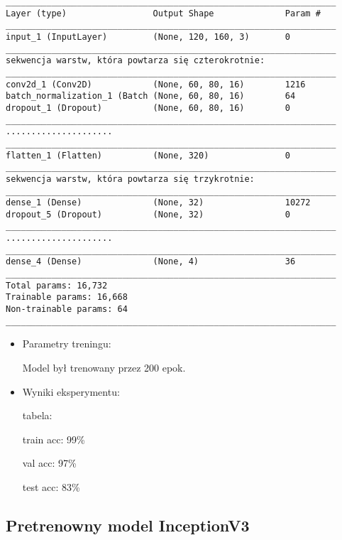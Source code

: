 \newsavebox\myv
\begin{lrbox}{\myv}\begin{minipage}{1.0\textwidth}
\begin{verbatim}
_________________________________________________________________
Layer (type)                 Output Shape              Param #   
_________________________________________________________________
input_1 (InputLayer)         (None, 120, 160, 3)       0        
_________________________________________________________________
sekwencja warstw, która powtarza się czterokrotnie:
_________________________________________________________________
conv2d_1 (Conv2D)            (None, 60, 80, 16)        1216      
batch_normalization_1 (Batch (None, 60, 80, 16)        64        
dropout_1 (Dropout)          (None, 60, 80, 16)        0    
_________________________________________________________________
.....................
_________________________________________________________________
flatten_1 (Flatten)          (None, 320)               0         
_________________________________________________________________
sekwencja warstw, która powtarza się trzykrotnie:
_________________________________________________________________
dense_1 (Dense)              (None, 32)                10272     
dropout_5 (Dropout)          (None, 32)                0         
_________________________________________________________________
.....................
_________________________________________________________________
dense_4 (Dense)              (None, 4)                 36        
_________________________________________________________________
Total params: 16,732
Trainable params: 16,668
Non-trainable params: 64
_________________________________________________________________
\end{verbatim} 
\end{minipage}\end{lrbox}
\resizebox{0.75\textwidth}{!}{\usebox\myv}

\begin{itemize}
\item Parametry treningu:

Model był trenowany przez 200 epok.
\item Wyniki eksperymentu:

tabela:

train acc: 99\%

val acc: 97\%

test acc: 83\%
\end{itemize}
\subsection{Pretrenowny model InceptionV3 \cite{kaggle_3}}

